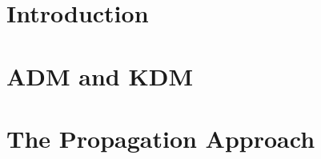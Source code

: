 

\begin{abstract}
\linespread{0.87}

\end{abstract}





%
\IEEEpeerreviewmaketitle
\section{Introduction}
	\linespread{0.87}
	


\section{ADM and KDM} \label{sec:background}
	\linespread{0.87}
		

%	
\section{The Propagation Approach} \label{sec:the_approach}
	\linespread{0.87}
	
%	
